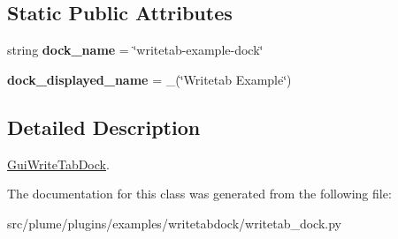 \subsection*{Static Public Attributes}
\begin{DoxyCompactItemize}
\item 
string {\bfseries dock\+\_\+name} = \char`\"{}writetab-\/example-\/dock\char`\"{}\hypertarget{classplume-creator_1_1src_1_1plume_1_1plugins_1_1examples_1_1writetabdock_1_1writetab__dock_1_1_gui_write_tab_dock_a03b334923982c87da427bf1bbea2f316}{}\label{classplume-creator_1_1src_1_1plume_1_1plugins_1_1examples_1_1writetabdock_1_1writetab__dock_1_1_gui_write_tab_dock_a03b334923982c87da427bf1bbea2f316}

\item 
{\bfseries dock\+\_\+displayed\+\_\+name} = \+\_\+(\char`\"{}Writetab Example\char`\"{})\hypertarget{classplume-creator_1_1src_1_1plume_1_1plugins_1_1examples_1_1writetabdock_1_1writetab__dock_1_1_gui_write_tab_dock_a7cb6b4ff870e0636af6c8d8e559e25f2}{}\label{classplume-creator_1_1src_1_1plume_1_1plugins_1_1examples_1_1writetabdock_1_1writetab__dock_1_1_gui_write_tab_dock_a7cb6b4ff870e0636af6c8d8e559e25f2}

\end{DoxyCompactItemize}


\subsection{Detailed Description}
\hyperlink{classplume-creator_1_1src_1_1plume_1_1plugins_1_1examples_1_1writetabdock_1_1writetab__dock_1_1_gui_write_tab_dock}{Gui\+Write\+Tab\+Dock}. 

The documentation for this class was generated from the following file\+:\begin{DoxyCompactItemize}
\item 
src/plume/plugins/examples/writetabdock/writetab\+\_\+dock.\+py\end{DoxyCompactItemize}
